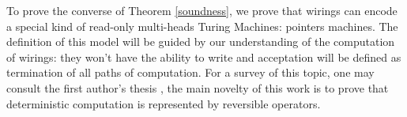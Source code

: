 To prove the converse of Theorem \ref{soundness}, we prove that wirings can encode a special kind of read-only multi-heads Turing Machines: pointers machines.
The definition of this model will be guided by our understanding of the computation of wirings: they won't have the ability to write and acceptation will be defined as termination of all paths of computation.
For a survey of this topic, one may consult the first author's thesis \cite[Chap.4]{Aubert2013b}, the main novelty of this work is to prove that deterministic computation is represented by reversible operators.



